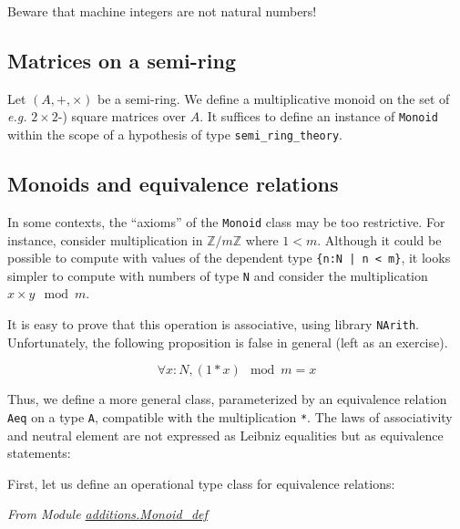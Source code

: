
Beware that machine integers are not natural numbers! 


\subsection{Matrices on a semi-ring}

Let $(A,+,\times)$ be a semi-ring. We define a multiplicative monoid on the set of \emph{e.g.} $2\times 2$-) square matrices over $A$.
It suffices to define an instance of \texttt{Monoid} within the scope of a hypothesis
of type \texttt{semi\_ring\_theory}.




\subsection{Monoids and equivalence relations}

In some contexts, the ``axioms'' of the \texttt{Monoid} class  may be too restrictive.
For instance, consider multiplication in $\mathds{Z}/m\mathds{Z}$ where
 $1<m$.
Although it could be possible to compute with values of the dependent 
type \texttt{\{n:N | n < m\}}, 
it looks simpler to compute with numbers of type
\texttt{N} and consider the multiplication $x \times y \mod{m}$.



It is easy to prove that this operation is associative, using library \texttt{NArith}. Unfortunately, the following proposition is false in general (left as an exercise).

$$\forall x:N, (1 * x) \mod{m} = x$$


Thus, we define a more general class, parameterized by an equivalence
relation \texttt{Aeq}  on a type \texttt{A}, compatible with the multiplication \texttt{*}. The laws of associativity and neutral element
are not expressed as Leibniz equalities but as equivalence statements:

First, let us define an operational type class for equivalence relations:

\vspace{4pt}

\noindent
\emph{From Module \href{../theories/html/additions.Monoid_def.html}{additions.Monoid\_def}}

